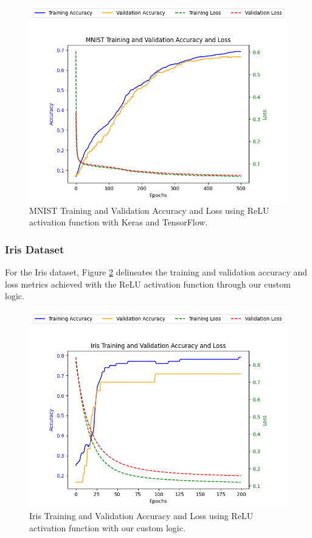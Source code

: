 \documentclass[letterpaper]{article}
\begin{document}
\begin{figure}[h]
    \centering
    \includegraphics[width=0.8\linewidth]{mnist_relu_keras_tf.png} %
    \caption{MNIST Training and Validation Accuracy and Loss using ReLU activation function with Keras and TensorFlow.}
    \label{fig:mnist_keras_tf}
\end{figure}

\subsubsection{Iris Dataset}
For the Iris dataset, Figure \ref{fig:iris_graph} delineates the training and validation accuracy and loss metrics achieved with the ReLU activation function through our custom logic.

\begin{figure}[h]
    \centering
    \includegraphics[width=0.8\linewidth]{iris_relu_custom.png} %
    \caption{Iris Training and Validation Accuracy and Loss using ReLU activation function with our custom logic.}
    \label{fig:iris_graph}
\end{figure}
\end{document}
